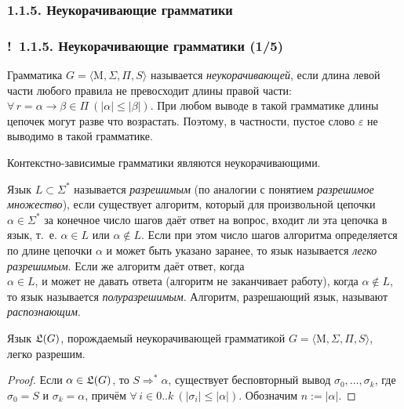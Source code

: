 \documentclass[mathserif,12pt,aspectratio=169]{beamer}
\def\emразделенной{\em разделенной}
\renewcommand{\index}[1]{}
\def\em#1{\it\color{blue}#1}
\def\odmkey#1#2{{\it\color{red} #1}\index{#2}}
\def\Assign{\operatorname{:=}}
\def\A#1#2{\forall\,#1\ \left(#2\right)}
\def\Tuple#1#2#3{{#1}_{#2},\dots,{#1}_{#3}}
\def\Not{\neg}
\let\leq\leqslant
\def\Ok{{\color{green}\textbf{!}\ }}
\begin{document}
\subsubsection{1.1.5. Неукорачивающие грамматики}
\label{1.1.5.}
\begin{frame}
\frametitle{\Ok 1.1.5. Неукорачивающие грамматики (1/5)}

Грамматика $G=\langle \mathrm{M}, \Sigma, \Pi, S\rangle$ называется
\odmkey{неукорачивающей}{Грамматика!неукорачивающая}, если
длина левой части любого правила не превосходит
длины правой части:
$\A{r=\alpha\rightarrow\beta\in \Pi}{|\alpha|\leq|\beta|}$. При
любом выводе в такой грамматике длины цепочек могут разве что
возрастать. Поэтому, в частности, пустое слово $\varepsilon$ не
выводимо в такой грамматике.
\begin{example}
Контекстно-зависимые грамматики являются неукорачивающими.
\end{example}

Язык $L\subset \Sigma^*$ называется
\odmkey{разрешимым}{Язык!разрешимый}
(по аналогии с понятием {\em разрешимое множество}), если существует
алгоритм, который для произвольной цепочки $\alpha\in \Sigma^*$ за
конечное число шагов даёт ответ на вопрос, входит ли эта цепочка в
язык, т.~е. $\alpha\in L$ или $\alpha\not\in L$. Если при этом число шагов алгоритма определяется по длине цепочки
$\alpha$ и может быть указано заранее, то язык называется
\odmkey{легко разрешимым}{Язык!легко разрешимый}.
Если же алгоритм даёт ответ, когда \\$\alpha \in L$, и может не давать ответа (алгоритм не заканчивает работу),
когда $\alpha\not\in L$, то язык называется
\odmkey{полуразрешимым}{Язык!полуразрешимый}.
Алгоритм, разрешающий язык, называют  \odmkey{распознающим}{Язык!распознаваемый}. 

\begin{theorem}
Язык $\frak{L}(G)$, порождаемый неукорачивающей грамматикой
 $G=\langle \mathrm{M}, \Sigma, \Pi, S\rangle$, \\легко разрешим.
\end{theorem}
\begin{proof}
Если $\alpha\in \frak{L}(G)$, то $S\Rightarrow^*\alpha$, существует бесповторный вывод $\Tuple{\sigma}{0}{k}$,
где $\sigma_0 = S$ и
$\sigma_k=\alpha$, причём 
 $\A{i\in 0..k}{|\sigma_i|\leq|\alpha|}$. Обозначим $n\Assign|\alpha|$.
\end{proof}
\end{frame}
\end{document}

